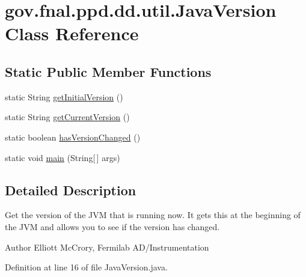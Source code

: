 \hypertarget{classgov_1_1fnal_1_1ppd_1_1dd_1_1util_1_1JavaVersion}{\section{gov.\-fnal.\-ppd.\-dd.\-util.\-Java\-Version Class Reference}
\label{classgov_1_1fnal_1_1ppd_1_1dd_1_1util_1_1JavaVersion}
}
\subsection*{Static Public Member Functions}
\begin{DoxyCompactItemize}
\item 
static String \hyperlink{classgov_1_1fnal_1_1ppd_1_1dd_1_1util_1_1JavaVersion_aa40b3f3db4ff65495edd5a18adbeed55}{get\-Initial\-Version} ()
\item 
static String \hyperlink{classgov_1_1fnal_1_1ppd_1_1dd_1_1util_1_1JavaVersion_ab127bb617d7b81a0c0e6146b434ebff0}{get\-Current\-Version} ()
\item 
static boolean \hyperlink{classgov_1_1fnal_1_1ppd_1_1dd_1_1util_1_1JavaVersion_a664336c886ac7e00d30220ebb1f8b0f5}{has\-Version\-Changed} ()
\item 
static void \hyperlink{classgov_1_1fnal_1_1ppd_1_1dd_1_1util_1_1JavaVersion_ad7df44b9056ee809a98c0cb215069832}{main} (String\mbox{[}$\,$\mbox{]} args)
\end{DoxyCompactItemize}


\subsection{Detailed Description}
Get the version of the J\-V\-M that is running now. It gets this at the beginning of the J\-V\-M and allows you to see if the version has changed.

\begin{DoxyAuthor}{Author}
Elliott Mc\-Crory, Fermilab A\-D/\-Instrumentation 
\end{DoxyAuthor}


Definition at line 16 of file Java\-Version.\-java.



